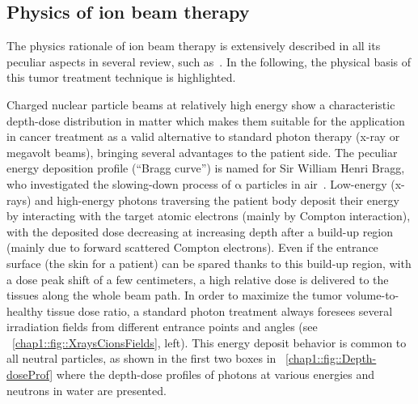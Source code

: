 \subsection{Physics of ion beam therapy}\label{chap1::subsec::Physics}
The physics rationale of ion beam therapy is extensively described in all its peculiar aspects in several review, such as~\cite{Lomax2009, Belkic2010, Schardt2010, Bichsel2013, Nupecc2014,  Newhauser2015, Durante2016}. In the following, the physical basis of this tumor treatment technique is highlighted.
 
Charged nuclear particle beams at relatively high energy show a characteristic depth-dose distribution in matter which makes them suitable for the application in cancer treatment as a valid alternative to standard photon therapy (x-ray or megavolt beams), bringing several advantages to the patient side. The peculiar energy deposition profile (\enquote{Bragg curve}) is named for Sir William Henri Bragg, who investigated the slowing-down process of $\mathrm{\alpha}$ particles in air~\parencite{Bragg1904, Bragg1905}. 
Low-energy (x-rays) and high-energy photons traversing the patient body deposit their energy by interacting with the target atomic electrons (mainly by Compton interaction), with the deposited dose decreasing at increasing depth after a build-up region (mainly due to forward scattered Compton electrons). Even if the entrance surface (the skin for a patient) can be spared thanks to this build-up region, with a dose peak shift of a few centimeters, a high relative dose is delivered to the tissues along the whole beam path. In order to maximize the tumor volume-to-healthy tissue dose ratio, a standard photon treatment always foresees several irradiation fields from different entrance points and angles (see \figurename~\ref{chap1::fig::XraysCionsFields}, left). This energy deposit behavior is common to all neutral particles, as shown in the first two boxes in \figurename~\ref{chap1::fig::Depth-doseProf} where the depth-dose profiles of photons at various energies and neutrons in water are presented. 
